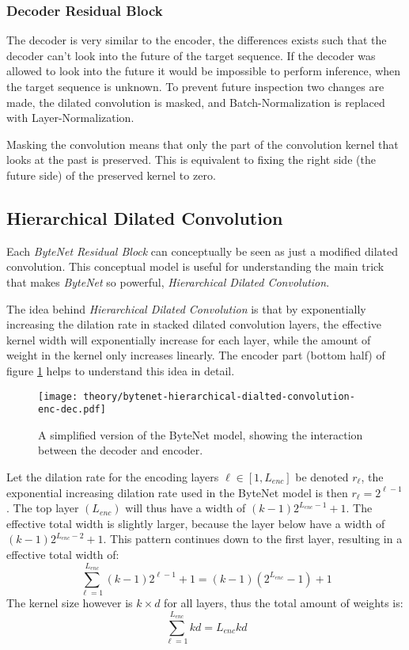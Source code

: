 \subsubsection{Decoder Residual Block}

The decoder is very similar to the encoder, the differences exists such that the decoder can't look into the future of the target sequence. If the decoder was allowed to look into the future it would be impossible to perform inference, when the target sequence is unknown. To prevent future inspection two changes are made‚ the dilated convolution is masked, and Batch-Normalization is replaced with Layer-Normalization.

Masking the convolution means that only the part of the convolution kernel that looks at the past is preserved. This is equivalent to fixing the right side (the future side) of the preserved kernel to zero.

\subsection{Hierarchical Dilated Convolution}
\label{sec:theory:bytenet:hierarchical-dilated-convolution}

Each \textit{ByteNet Residual Block} can conceptually be seen as just a modified dilated convolution. This conceptual model is useful for understanding the main trick that makes \textit{ByteNet} so powerful, \textit{Hierarchical Dilated Convolution}.

The idea behind \textit{Hierarchical Dilated Convolution} is that by exponentially increasing the dilation rate in stacked dilated convolution layers, the effective kernel width will exponentially increase for each layer, while the amount of weight in the kernel only increases linearly. The encoder part (bottom half) of figure \ref{fig:bytenet:simplified-hdc} helps to understand this idea in detail.

\begin{figure}[h]
    \centering
    \texttt{[image: theory/bytenet-hierarchical-dialted-convolution-enc-dec.pdf]}
    \caption{A simplified version of the ByteNet model, showing the interaction between the decoder and encoder.}
    \label{fig:bytenet:simplified-hdc}
\end{figure}

Let the dilation rate for the encoding layers $\ell \in [1, L_{enc}]$ be denoted $r_\ell$, the exponential increasing dilation rate used in the ByteNet model is then $r_\ell = 2^{\ell - 1}$. The top layer $(L_{enc})$ will thus have a width of $(k-1) 2^{L_{enc} -1} + 1$. The effective total width is slightly larger, because the layer below have a width of $(k-1) 2^{L_{enc} - 2} + 1$. This pattern continues down to the first layer, resulting in a effective total width of:
\begin{equation}
\sum_{\ell = 1}^{L_{enc}} (k - 1) 2^{\ell-1} + 1 = (k - 1) (2^{L_{enc}} - 1) + 1
\end{equation}
The kernel size however is $k \times d$ for all layers, thus the total amount of weights is:
\begin{equation}
\sum_{\ell = 1}^{L_{enc}} k d = L_{enc} k d
\end{equation}

